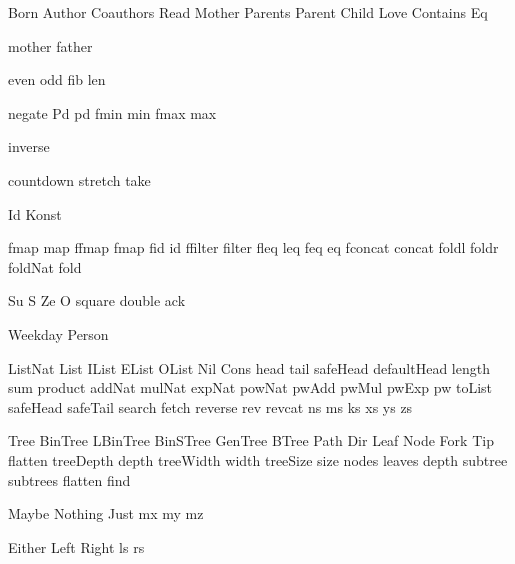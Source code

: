
\DefRel Born
\DefRel Author
\DefRel Coauthors
\DefRel Read
\DefRel Mother
\DefRel Parents
\DefRel Parent
\DefRel Child
\DefRel Love
\DefRel Contains
\DefRel Eq

\DefFun mother
\DefFun father

\DefFun even
\DefFun odd
\DefFun fib
\DefFun len

\DefFpf negate
\DefFPF Pd pd
\DefFPF fmin   min
\DefFPF fmax   max

\DefFpf inverse

\DefFpf countdown
\DefFpf stretch
\DefFpf take

\DefType Id
\DefType Konst

\DefFPF fmap     map
\DefFPF ffmap    fmap
\DefFPF fid      id
\DefFPF ffilter  filter
\DefFPF fleq     leq
\DefFPF feq      eq
\DefFPF fconcat  concat
\DefFpf foldl
\DefFpf foldr
\DefFpf foldNat
\DefFpf fold

\DefCONS Su S
\DefCONS Ze O
\DefFpf  square
\DefFpf  double
\DefFpf  ack

\DefType Weekday
\DefType Person

\DefType ListNat
\DefType List
\DefType IList
\DefType EList
\DefType OList
\DefCons Nil
\DefCons Cons
\DefFpf  head
\DefFpf  tail
\DefFpf  safeHead
\DefFpf  defaultHead
\DefFpf  length
\DefFpf  sum
\DefFpf  product
\DefFpf  addNat
\DefFpf  mulNat
\DefFpf  expNat
\DefFpf  powNat
\DefFpf  pwAdd
\DefFpf  pwMul
\DefFpf  pwExp
\DefFpf  pw
\DefFpf  toList
\DefFpf  safeHead
\DefFpf  safeTail
\DefFpf  search
\DefFpf  fetch
\DefFpf  reverse
\DefFpf  rev
\DefFpf  revcat
\DefVar  ns
\DefVar  ms
\DefVar  ks
\DefVar  xs
\DefVar  ys
\DefVar  zs

\DefType Tree
\DefType BinTree
\DefType LBinTree
\DefType BinSTree
\DefType GenTree
\DefType BTree
\DefType Path
\DefType Dir
\DefCons Leaf
\DefCons Node
\DefCons Fork
\DefCons Tip
\DefFpf  flatten
\DefFPF  treeDepth  depth
\DefFPF  treeWidth  width
\DefFPF  treeSize   size
\DefFpf  nodes
\DefFpf  leaves
\DefFpf  depth
\DefFpf  subtree
\DefFpf  subtrees
\DefFpf  flatten
\DefFpf  find


\DefType Maybe
\DefCons Nothing
\DefCons Just
\DefVar  mx
\DefVar  my
\DefVar  mz

\DefType Either
\DefCons Left
\DefCons Right
\DefVar  ls
\DefVar  rs

\def\bla{\mathrm{bla}}
\def\blu{\mathrm{blu}}

\def\persons{{\cal P}}
\let\pers=\persons

\def\euclid{\algorithmstylize{Euclid}}%

\def\Smile{\rel{\woohoo}}
\def\Frown{\rel{\boohoo}}

\def\oddAs#1{A_{[#1]}}

